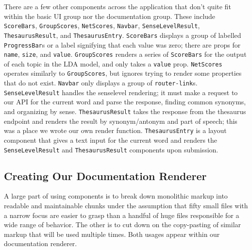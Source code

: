 \documentclass[11pt, twoside, reqno]{book}
\begin{document}
There are a few other components across the application that don't quite fit within the basic UI group nor the documentation group. These include \texttt{ScoreBars}, \texttt{GroupScores}, \texttt{NetScores}, \texttt{Navbar}, \texttt{SenseLevelResult}, \texttt{ThesaurusResult}, and \texttt{ThesaurusEntry}. \texttt{ScoreBars} displays a group of labelled \texttt{ProgressBar}s or a label signifying that each value was zero; there are props for \texttt{name}, \texttt{size}, and \texttt{value}. \texttt{GroupScores} renders a series of \texttt{ScoreBars} for the output of each topic in the LDA model, and only takes a \texttt{value} prop. \texttt{NetScores} operates similarly to \texttt{GroupScores}, but ignores trying to render some properties that do not exist. \texttt{Navbar} only displays a group of \texttt{router-link}s. \texttt{SenseLevelResult} handles the senselevel rendering; it must make a request to our API for the current word and parse the response, finding common synonyms, and organizing by sense. \texttt{ThesaurusResult} takes the response from the thesaurus endpoint and renders the result by synonym/antonym and part of speech; this was a place we wrote our own render function. \texttt{ThesaurusEntry} is a layout component that gives a text input for the current word and renders the \texttt{SenseLevelResult} and \texttt{ThesaurusResult} components upon submission.

\subsection{Creating Our Documentation Renderer}

A large part of using components is to break down monolithic markup into readable and maintainable chunks under the assumption that fifty small files with a narrow focus are easier to grasp than a handful of huge files responsible for a wide range of behavior. The other is to cut down on the copy-pasting of similar markup that will be used multiple times. Both usages appear within our documentation renderer.
\end{document}
